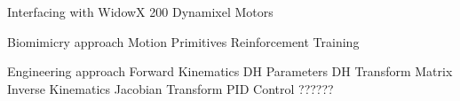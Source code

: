 Interfacing with WidowX 200
    Dynamixel Motors



Biomimicry approach
    Motion Primitives
    Reinforcement Training
    


Engineering approach
    Forward Kinematics
        DH Parameters
        DH Transform Matrix
    Inverse Kinematics
        Jacobian Transform
    PID Control
        ??????

